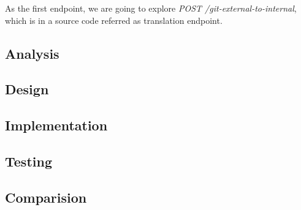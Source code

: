 \documentclass[../main.tex]{subfiles}
\begin{document}
As the first endpoint, we are going to explore \textit{POST /git-external-to-internal}, which is in a source code referred as translation endpoint.

\subsection{Analysis}


\subsection{Design}


\subsection{Implementation}


\subsection{Testing}


\subsection{Comparision}

\end{document}
